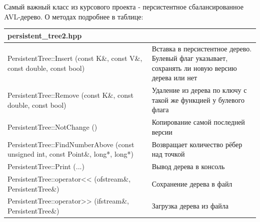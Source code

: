 Самый важный класс из курсового проекта - персистентное сбалансированное AVL-дерево. О методах подробнее в таблице:

\begin{longtable}{|p{7.5cm}|p{7.5cm}|}
\hline
\rowcolor{lightgray}
\multicolumn{2}{|c|} {persistent\_tree2.hpp}\\
\hline
PersistentTree::Insert (const K\&, const V\&, const double, const bool) & Вставка в персистентное дерево. Булевый флаг указывает, сохранять ли новую версию дерева или нет\\
\hline
PersistentTree::Remove (const K\&, const double, const bool) & Удаление из дерева по ключу с такой же функцией у булевого флага\\
\hline
PersistentTree::NotChange () & Копирование самой последней версии \\
\hline
PersistentTree::FindNumberAbove (const unsigned int, const Point\&, long*, long*) & Возвращает количество рёбер над точкой\\
\hline
PersistentTree::Print (...) & Вывод дерева в консоль\\
\hline
PersistentTree::operator<< (ofstream\&, PersistentTree\&) & Сохранение дерева в файл\\
\hline
PersistentTree::operator>> (ifstream\&, PersistentTree\&) & Загрузка дерева из файла\\
\hline
\end{longtable}

